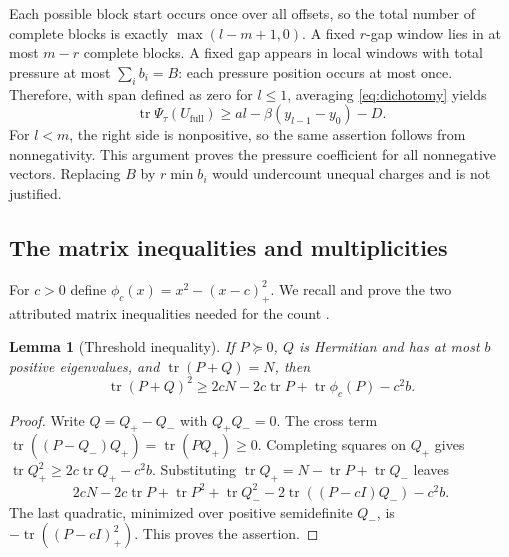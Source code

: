 \documentclass[11pt]{article}
\newcommand{\tr}{\operatorname{tr}}
\newtheorem{lemma}[theorem]{Lemma}
\theoremstyle{remark}\newtheorem{remark}[theorem]{Remark}
\begin{document}
Each possible block start occurs once over all offsets, so the total number
of complete blocks is exactly $\max(l-m+1,0)$. A fixed $r$-gap window lies
in at most $m-r$ complete blocks. A fixed gap appears in local windows with
total pressure at most $\sum_i b_i=B$: each pressure position occurs at
most once. Therefore, with span defined as zero for $l\le1$, averaging
\eqref{eq:dichotomy} yields
\begin{equation}\label{eq:globaldefect}
 \tr\Psi_\tau(U_{\mathrm{full}})
 \ge a l-\beta(y_{l-1}-y_0)-D.
\end{equation}
For $l<m$, the right side is nonpositive, so the same assertion follows
from nonnegativity. This argument proves the pressure coefficient for all
nonnegative vectors. Replacing $B$ by $r\min b_i$ would undercount unequal
charges and is not justified.

\subsection{The matrix inequalities and multiplicities}
For $c>0$ define $\phi_c(x)=x^2-(x-c)_+^2$. We recall and prove the
two attributed matrix inequalities needed for the count \cite{knausgard}.

\begin{lemma}[Threshold inequality]\label{lem:threshold}
If $P\succeq0$, $Q$ is Hermitian and has at most $b$ positive eigenvalues,
and $\tr(P+Q)=N$, then
\[
 \tr(P+Q)^2\ge2cN-2c\tr P+\tr\phi_c(P)-c^2b.
\]
\end{lemma}
\begin{proof}
Write $Q=Q_+-Q_-$ with $Q_+Q_-=0$. The cross term
$\tr((P-Q_-)Q_+)=\tr(PQ_+)\ge0$. Completing squares on $Q_+$ gives
$\tr Q_+^2\ge2c\tr Q_+-c^2b$. Substituting
$\tr Q_+=N-\tr P+\tr Q_-$ leaves
\[
 2cN-2c\tr P+\tr P^2+
 \tr Q_-^2-2\tr((P-cI)Q_-)-c^2b.
\]
The last quadratic, minimized over positive semidefinite $Q_-$, is
$-\tr((P-cI)_+^2)$. This proves the assertion.
\end{proof}
\end{document}
